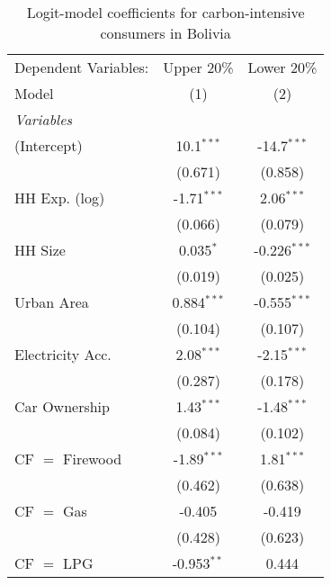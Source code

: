 
\begin{table}[htbp!]
   \centering
   \small
   \begin{adjustbox}{width = 1\textwidth, max height = 0.95\textheight, center}
      \begin{threeparttable}[b]
         \caption{\label{tab:Logit_1_BOL} Logit-model coefficients for carbon-intensive consumers in Bolivia}
         \begin{tabular}{lcc}
            \tabularnewline \midrule \midrule
            Dependent Variables: & Upper 20\%    & Lower 20\%\\   
            Model                & (1)           & (2)\\  
            \midrule
            \emph{Variables}\\
            (Intercept)          & 10.1$^{***}$  & -14.7$^{***}$\\   
                                 & (0.671)       & (0.858)\\   
            HH Exp. (log)        & -1.71$^{***}$ & 2.06$^{***}$\\   
                                 & (0.066)       & (0.079)\\   
            HH Size              & 0.035$^{*}$   & -0.226$^{***}$\\   
                                 & (0.019)       & (0.025)\\   
            Urban Area           & 0.884$^{***}$ & -0.555$^{***}$\\   
                                 & (0.104)       & (0.107)\\   
            Electricity Acc.     & 2.08$^{***}$  & -2.15$^{***}$\\   
                                 & (0.287)       & (0.178)\\   
            Car Ownership        & 1.43$^{***}$  & -1.48$^{***}$\\   
                                 & (0.084)       & (0.102)\\   
            CF $=$ Firewood      & -1.89$^{***}$ & 1.81$^{***}$\\   
                                 & (0.462)       & (0.638)\\   
            CF $=$ Gas           & -0.405        & -0.419\\   
                                 & (0.428)       & (0.623)\\   
            CF $=$ LPG           & -0.953$^{**}$ & 0.444\\   

\end{tabular}
\end{threeparttable}
\end{adjustbox}
\end{table}
